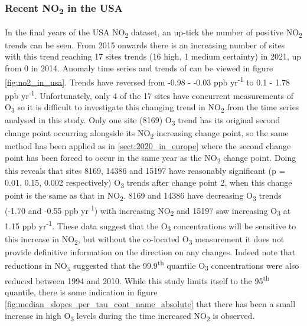 \documentclass[journal abbreviation, manuscript]{copernicus}
\begin{document}
\subsubsection{Recent NO\textsubscript{2} in the USA} 
In the final years of the USA NO\textsubscript{2} dataset, an up-tick the number of positive NO\textsubscript{2} trends can be seen. From 2015 onwards there is an increasing number of sites with this trend reaching 17 sites trends (16 high, 1 medium certainty) in 2021, up from 0 in 2014. Anomaly time series and trends of can be viewed in figure \ref{fig:no2_in_usa}. Trends have reversed from -0.98 - -0.03 ppb yr\textsuperscript{-1} to 0.1 - 1.78 ppb yr\textsuperscript{-1}. Unfortunately, only 4 of the 17 sites have concurrent measurements of O\textsubscript{3} so it is difficult to investigate this changing trend in NO\textsubscript{2} from the time series analysed in this study. Only one site (8169) O\textsubscript{3} trend has its original second change point occurring alongside its NO\textsubscript{2} increasing change point, so the same method has been applied as in \ref{sect:2020_in_europe} where the second change point has been forced to occur in the same year as the NO\textsubscript{2} change point. Doing this reveals that sites 8169, 14386 and 15197 have reasonably significant (p = 0.01, 0.15, 0.002 respectively) O\textsubscript{3} trends after change point 2, when this change point is the same as that in NO\textsubscript{2}. 8169 and 14386 have decreasing O\textsubscript{3} trends (-1.70 and -0.55 ppb yr\textsuperscript{-1}) with increasing NO\textsubscript{2} and 15197 saw increasing O\textsubscript{3} at 1.15 ppb yr\textsuperscript{-1}. These data suggest that the O\textsubscript{3} concentrations will be sensitive to this increase in NO\textsubscript{2}, but without the co-located O\textsubscript{3} measurement it does not provide definitive information on the direction on any changes. Indeed \cite{Jhun2015} note that reductions in NO\textsubscript{x} suggested that the 99.9\textsuperscript{th} quantile O\textsubscript{3} concentrations were also reduced between 1994 and 2010. While this study limits itself to the 95\textsuperscript{th} quantile, there is some indication in figure \ref{fig:median_slopes_per_tau_cont_name_absolute} that there has been a small increase in high O\textsubscript{3} levels during the time increased NO\textsubscript{2} is observed.
\end{document}
